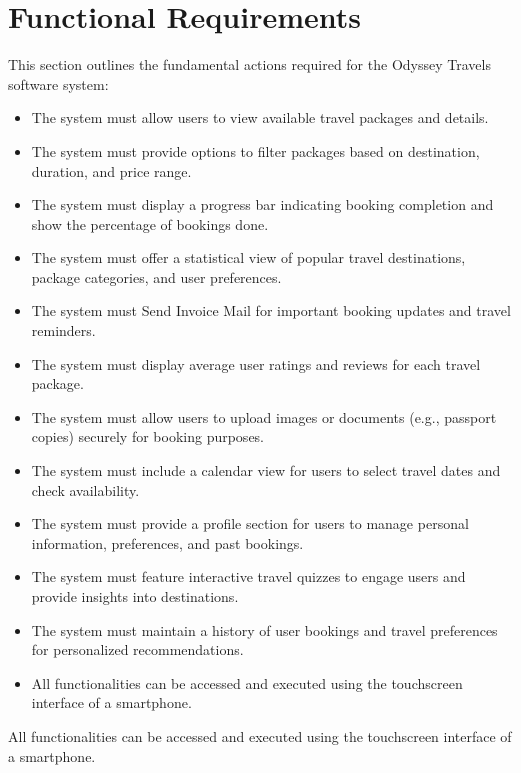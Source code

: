\documentclass{scrreprt}
\begin{document}
\section{Functional Requirements}
This section outlines the fundamental actions required for the Odyssey Travels software system:
\begin{itemize}
    \item The system must allow users to view available travel packages and details.
    \item The system must provide options to filter packages based on destination, duration, and price range.
    \item The system must display a progress bar indicating booking completion and show the percentage of bookings done.
    \item The system must offer a statistical view of popular travel destinations, package categories, and user preferences.
    \item The system must Send Invoice Mail for important booking updates and travel reminders.
    \item The system must display average user ratings and reviews for each travel package.
    \item The system must allow users to upload images or documents (e.g., passport copies) securely for booking purposes.
    \item The system must include a calendar view for users to select travel dates and check availability.
    \item The system must provide a profile section for users to manage personal information, preferences, and past bookings.
    \item The system must feature interactive travel quizzes to engage users and provide insights into destinations.
    \item The system must maintain a history of user bookings and travel preferences for personalized recommendations.
    \item All functionalities can be accessed and executed using the touchscreen interface of a smartphone.
\end{itemize}
All functionalities can be accessed and executed using the touchscreen interface of a smartphone.
\end{document}

